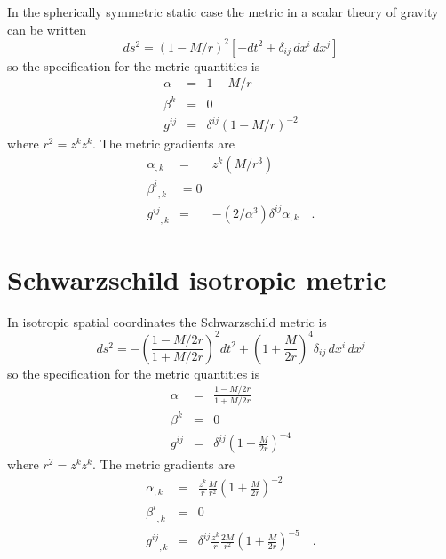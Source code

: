     In the spherically symmetric static case the metric in a scalar
theory of gravity can be written
    \begin{equation}\label{eq-Sclr}
    ds^2 = (1-M/r)^2 [- dt^2 + \delta_{ij}\,dx^i\,dx^j]
    \end{equation}
    so the specification for the metric quantities is
    \begin{eqnarray}\label{eq-gSclr}
    \alpha  & = & 1 - M/r\\
    \beta^k & = & 0\\
    g^{ij} & = & \delta^{ij} (1 - M/r)^{-2}
    \end{eqnarray}
    where $r^2 = z^k z^k$.
    The metric gradients are
    \begin{eqnarray}\label{eq-dgSclr}
    \alpha_{,k}  & = & z^k (M/r^3)\\
    {\beta^i}_{,k} & = 0\\
    {g^{ij}}_{,k} & = & -(2/\alpha^3)\delta^{ij} \alpha_{,k}
    \quad .
    \end{eqnarray}

\section{Schwarzschild isotropic metric}

    In isotropic spatial coordinates the Schwarzschild metric is
    \begin{equation}\label{eq-Schwiso}
    ds^2 = - \left( \frac{1-M/2r}{1+M/2r} \right)^2 dt^2 
    + \left( 1 + \frac{M}{2r} \right)^4 \delta_{ij}\,dx^i\,dx^j
    \end{equation}
    so the specification for the metric quantities is
    \begin{eqnarray}\label{eq-gSchwiso}
    \alpha  & = & \frac{1-M/2r}{1+M/2r} \\
    \beta^k & = & 0 \\
    g^{ij} & = & \delta^{ij} \left( 1 + \frac{M}{2r} \right)^{-4} 
    \end{eqnarray}
    where $r^2 = z^k z^k$.
    The metric gradients are
    \begin{eqnarray}\label{eq-dgSchwiso}
    \alpha_{,k}  & = & \frac{z^k}{r} \frac{M}{r^2}
            \left( 1 + \frac{M}{2r} \right)^{-2} \\
    {\beta^i}_{,k} & = & 0 \\
    {g^{ij}}_{,k} & = & \delta^{ij} \frac{z^k}{r} \frac{2 M}{r^2}
    \left( 1 + \frac{M}{2r} \right)^{-5} 
    \quad .
    \end{eqnarray}

